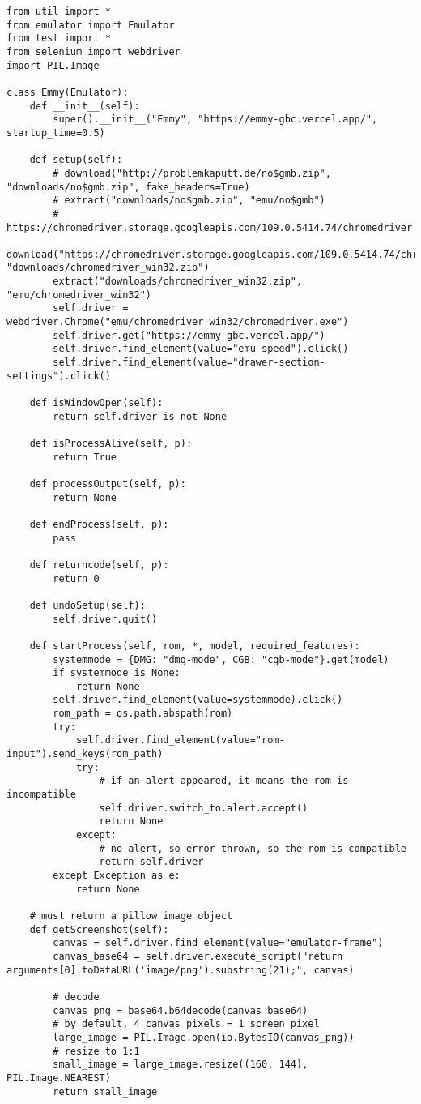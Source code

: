\begin{verbatim}
from util import *
from emulator import Emulator
from test import *
from selenium import webdriver
import PIL.Image

class Emmy(Emulator):
    def __init__(self):
        super().__init__("Emmy", "https://emmy-gbc.vercel.app/", startup_time=0.5)

    def setup(self):
        # download("http://problemkaputt.de/no$gmb.zip", "downloads/no$gmb.zip", fake_headers=True)
        # extract("downloads/no$gmb.zip", "emu/no$gmb")
        # https://chromedriver.storage.googleapis.com/109.0.5414.74/chromedriver_win32.zip
        download("https://chromedriver.storage.googleapis.com/109.0.5414.74/chromedriver_win32.zip", "downloads/chromedriver_win32.zip")
        extract("downloads/chromedriver_win32.zip", "emu/chromedriver_win32")
        self.driver = webdriver.Chrome("emu/chromedriver_win32/chromedriver.exe")
        self.driver.get("https://emmy-gbc.vercel.app/")
        self.driver.find_element(value="emu-speed").click()
        self.driver.find_element(value="drawer-section-settings").click()

    def isWindowOpen(self):
        return self.driver is not None

    def isProcessAlive(self, p):
        return True

    def processOutput(self, p):
        return None

    def endProcess(self, p):
        pass

    def returncode(self, p):
        return 0

    def undoSetup(self):
        self.driver.quit()

    def startProcess(self, rom, *, model, required_features):
        systemmode = {DMG: "dmg-mode", CGB: "cgb-mode"}.get(model)
        if systemmode is None:
            return None
        self.driver.find_element(value=systemmode).click()
        rom_path = os.path.abspath(rom)
        try:
            self.driver.find_element(value="rom-input").send_keys(rom_path)
            try:
                # if an alert appeared, it means the rom is incompatible
                self.driver.switch_to.alert.accept()
                return None
            except:
                # no alert, so error thrown, so the rom is compatible
                return self.driver
        except Exception as e:
            return None

    # must return a pillow image object
    def getScreenshot(self):
        canvas = self.driver.find_element(value="emulator-frame")
        canvas_base64 = self.driver.execute_script("return arguments[0].toDataURL('image/png').substring(21);", canvas)

        # decode
        canvas_png = base64.b64decode(canvas_base64)
        # by default, 4 canvas pixels = 1 screen pixel
        large_image = PIL.Image.open(io.BytesIO(canvas_png))
        # resize to 1:1
        small_image = large_image.resize((160, 144), PIL.Image.NEAREST)
        return small_image
\end{verbatim}